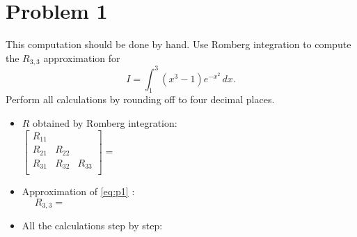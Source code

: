 \section{Problem 1}%
\label{sec:problem_1}
This computation should be done by hand. Use Romberg integration to compute the $R_{3, 3}$ approximation for
\begin{equation}
  \label{eq:p1}
  I = \int_{1}^{3} (x^{3} - 1) e^{-x^{2}} \, dx.
\end{equation}
Perform all calculations by rounding off to four decimal places.
\begin{solution}
  \quad
  \begin{itemize}
    \item $R$ obtained by Romberg integration:
      \begin{equation*}
        \begin{bmatrix}
          R_{11} &        &        \\
          R_{21} & R_{22} &        \\
          R_{31} & R_{32} & R_{33} \\
        \end{bmatrix}
        =
        \hspace{12cm}                                     %
      \end{equation*}
    \item Approximation of \eqref{eq:p1} :
      \begin{equation*}
        R_{3, 3} =
        \hspace{12cm}                                     %
      \end{equation*}
    \item All the calculations step by step:
      \newpage \quad \vfill                               %
  \end{itemize}
\end{solution}

